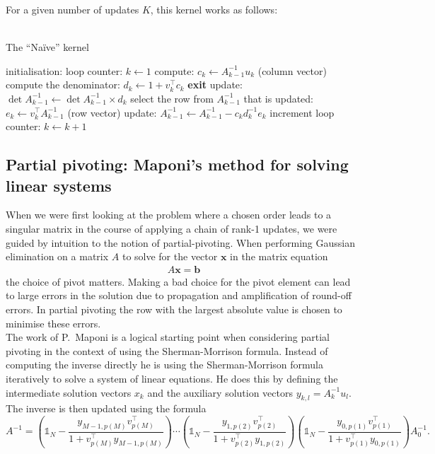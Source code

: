 \documentclass[11pt]{article}
\numberwithin{figure}{section}
\numberwithin{table}{section}
\begin{document}
				For a given number of updates $K$, this kernel works as follows:\\
				\\
				\begin{algorithm}[H]
				\caption{The ``Na\"{i}ve'' kernel}\label{algo:naive}
				initialisation: loop counter: $k \gets 1$\;
				{
					compute: $c_k \gets A^{-1}_{k-1}u_k$ (column vector)\;
					compute the denominator: $d_k \gets 1 + v_k^\top c_k$\;
					{
						\textbf{exit}\;
					}
					update: $\det A^{-1}_{k-1} \gets \det A^{-1}_{k-1}\times d_k$\;
					select the row from $A^{-1}_{k-1}$ that is updated: $e_k \gets v_k^\top A^{-1}_{k-1}$ (row vector)\;
					update: $A^{-1}_{k-1} \gets A^{-1}_{k-1} - c_kd_k^{-1}e_k$\;
					increment loop counter: $k \gets k + 1$\;
				}

				\end{algorithm}
		
			\subsection{Partial pivoting: Maponi's method for solving linear systems}
				When we were first looking at the problem where a chosen order leads to a singular matrix in the course of applying a chain of rank-1 updates, we were guided by intuition to the notion of partial-pivoting. When performing Gaussian elimination on a matrix $A$ to solve for the vector $\mathbf{x}$ in the matrix equation
				\begin{align}
					A\mathbf{x}=\mathbf{b}
				\end{align}
				the choice of pivot matters. Making a bad choice for the pivot element can lead to large errors in the solution due to propagation and amplification of round-off errors. In partial pivoting the row with the largest absolute value is chosen to minimise these errors.\\
				
				The work of P.~Maponi\cite{MAPONI2007276} is a logical starting point when considering partial pivoting in the context of using the Sherman-Morrison formula. Instead of computing the inverse directly he is using the Sherman-Morrison formula iteratively to solve a system of linear equations. He does this by defining the intermediate solution vectors $x_k$ and the auxiliary solution vectors $y_{k,l} = A^{-1}_{k}u_l$. The inverse is then updated using the formula
				\begin{equation}\label{eq:Ainv}
	A^{-1} =
		\left(\mathbb{1}_N-\frac{y_{M-1,p(M)}v_{p(M)}^\top }{1+v_{p(M)}^\top y_{M-1,p(M)}}\right)
		\cdots
		\left(\mathbb{1}_N-\frac{y_{1,p(2)}v_{p(2)}^\top }{1+v_{p(2)}^\top y_{1,p(2)}}\right)
		\left(\mathbb{1}_N-\frac{y_{0,p(1)}v_{p(1)}^\top }{1+v_{p(1)}^\top y_{0,p(1)}}\right)
		A_0^{-1}.
\end{equation}
				
\end{document}
